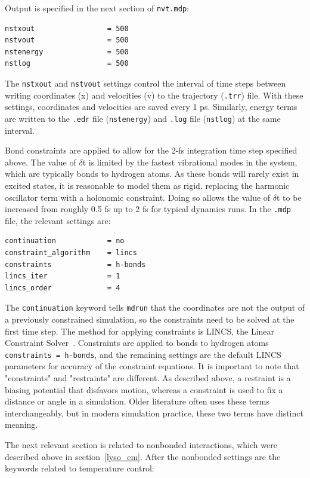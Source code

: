 \documentclass[9pt,tutorial]{livecoms}
\begin{document}
Output is specified in the next section of \texttt{nvt.mdp}:

\begin{verbatim}
nstxout                 = 500
nstvout                 = 500
nstenergy               = 500
nstlog                  = 500
\end{verbatim}

The \texttt{nstxout} and \texttt{nstvout} settings control the interval of time steps between writing coordinates (x) and velocities (v) to the trajectory (\texttt{.trr}) file. With these settings, coordinates and velocities are saved every 1 ps. Similarly, energy terms are written to the \texttt{.edr} file (\texttt{nstenergy}) and \texttt{.log} file (\texttt{nstlog}) at the same interval.

Bond constraints are applied to allow for the 2-fs integration time step specified above. The value of $\delta$t is limited by the fastest vibrational modes in the system, which are typically bonds to hydrogen atoms. As these bonds will rarely exist in excited states, it is reasonable to model them as rigid, replacing the harmonic oscillator term with a holonomic constraint. Doing so allows the value of $\delta$t to be increased from roughly 0.5 fs up to 2 fs for typical dynamics runs. In the \texttt{.mdp} file, the relevant settings are:

\begin{verbatim}
continuation            = no
constraint_algorithm    = lincs
constraints             = h-bonds
lincs_iter              = 1
lincs_order             = 4
\end{verbatim}

The \texttt{continuation} keyword tells \texttt{mdrun} that the coordinates are not the output of a previously constrained simulation, so the constraints need to be solved at the first time step. The method for applying constraints is LINCS, the Linear Constraint Solver~\cite{Hess1997,Hess2008b}. Constraints are applied to bonds to hydrogen atoms \texttt{constraints = h-bonds}, and the remaining settings are the default LINCS parameters for accuracy of the constraint equations. It is important to note that "constraints" and "restraints" are different. As described above, a restraint is a biasing potential that disfavors motion, whereas a constraint is used to fix a distance or angle in a simulation. Older literature often uses these terms interchangeably, but in modern simulation practice, these two terms have distinct meaning.

The next relevant section is related to nonbonded interactions, which were described above in section~\ref{lyso_em}. After the nonbonded settings are the keywords related to temperature control:
\end{document}
